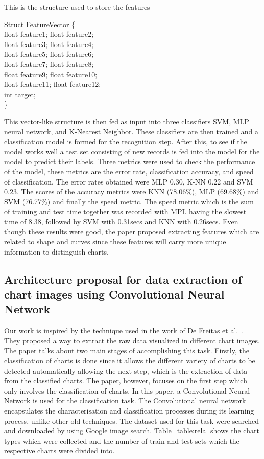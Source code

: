 \documentclass[12pt, a4paper,oneside]{report}
\begin{document}
\begin{algorithm}
\caption{This is the structure used to store the features}
\label{alg:1}
Struct FeatureVector \{\\
	float feature1; float feature2;\\
	float feature3; float feature4;\\
	float feature5; float feature6;\\
	float feature7; float feature8;\\
	float feature9; float feature10;\\
	float feature11; float feature12;\\
	int target;\\
\}
\end{algorithm}

This vector-like structure is then fed as input into three classifiers SVM, MLP neural network, and K-Nearest Neighbor. These classifiers are then trained and a classification model is formed for the recognition step. After this, to see if the model works well a test set consisting of new records is fed into the model for the model to predict their labels. Three metrics were used to check the performance of the model, these metrics are  the error rate, classification accuracy, and speed of classification. The error rates obtained were MLP 0.30, K-NN 0.22 and SVM 0.23. The scores of the accuracy metrics were KNN (78.06\%), MLP (69.68\%) and SVM (76.77\%) and finally the speed metric. The speed metric which is the sum of training and test time together was recorded with MPL having the slowest time of 8.38, followed by SVM with 0.31secs and KNN with 0.26secs. Even though these results were good, the paper proposed extracting features which are related to shape and curves since these features will carry more unique information to distinguish charts.

\subsection{Architecture proposal for data extraction of chart images using Convolutional Neural Network}
Our work is inspired by the technique used in the work of De Freitas et al.~\cite{junior2017archi}. They proposed a way to extract the raw data visualized in different chart images. The paper talks about two main stages of accomplishing this task. Firstly, the classification of charts is done since it allows the different variety of charts to be detected automatically allowing the next step, which is the extraction of data from the classified charts. The paper, however, focuses on the first step which only involves the classification of charts. In this paper, a Convolutional Neural Network is used for the classification task. The Convolutional neural network encapsulates the characterisation and classification processes during its learning process, unlike other old techniques. The dataset used for this task were searched and downloaded by using Google image search. Table~\ref{table:rela} shows the chart types which were collected and the number of train and test sets which the respective charts were divided into.
\end{document}
